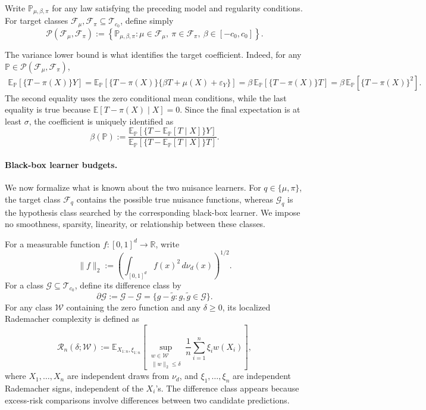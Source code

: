 \documentclass[11pt]{article}
\begin{document}
Write \(\mathbb P_{\mu,\beta,\pi}\) for any law satisfying the preceding
model and regularity conditions.  For target classes
\(\mathcal F_\mu,\mathcal F_\pi\subseteq\mathcal T_{c_0}\), define simply
\begin{equation}
\mathcal P(\mathcal F_\mu,\mathcal F_\pi)
:=
\left\{\mathbb P_{\mu,\beta,\pi}:
\mu\in\mathcal F_\mu,\ 
\pi\in\mathcal F_\pi,\ 
\beta\in[-c_0,c_0]\right\}.
\label{eq:distribution-family}
\end{equation}

The variance lower bound is what identifies the target coefficient.  Indeed,
for any \(\mathbb P\in\mathcal P(\mathcal F_\mu,\mathcal F_\pi)\),
\begin{align*}
\mathbb E_{\mathbb P}\!\left[
\{T-\pi(X)\}Y
\right]
=
\mathbb E_{\mathbb P}\!\left[
\{T-\pi(X)\}
\{\beta T+\mu(X)+\varepsilon_Y\}
\right]
=
\beta\,
\mathbb E_{\mathbb P}\!\left[
\{T-\pi(X)\}T
\right]
=
\beta\,
\mathbb E_{\mathbb P}\![
\{T-\pi(X)\}^2].
\end{align*}
The second equality uses the zero conditional mean conditions, while the last equality is true because \(\mathbb E[T-\pi(X)\mid X]=0\).  Since the final expectation is at
least \(\sigma\), the coefficient is uniquely identified as
\begin{equation}
\beta(\mathbb P)
:=
\frac{
\mathbb E_{\mathbb P}[\{T-\mathbb E_{\mathbb P}[T\mid X]\}Y]
}{
\mathbb E_{\mathbb P}[\{T-\mathbb E_{\mathbb P}[T\mid X]\}T]
}.
\label{eq:beta-functional}
\end{equation}

\paragraph{Black-box learner budgets.}
We now formalize what is known about the two nuisance learners.  For
\(q\in\{\mu,\pi\}\), the target class \(\mathcal F_q\) contains the
possible true nuisance functions, whereas \(\mathcal G_q\) is the hypothesis
class searched by the corresponding black-box learner.  We impose no
smoothness, sparsity, linearity, or relationship between these classes.

For a measurable function \(f:[0,1]^d\to\mathbb R\), write
\[
\|f\|_2
:=
\left(
\int_{[0,1]^d}f(x)^2\,d\nu_d(x)
\right)^{1/2}.
\]
For a class \(\mathcal G\subseteq\mathcal T_{c_0}\), define its
difference class by
\[
\partial\mathcal G
:=
\mathcal G-\mathcal G
=
\{g-\widetilde g:g,\widetilde g\in\mathcal G\}.
\]
For any class \(\mathcal W\) containing the zero function and any
\(\delta\geq0\), its localized Rademacher complexity is defined as
\begin{equation}
\mathcal R_n(\delta;\mathcal W)
:=
\mathbb E_{X_{1:n},\xi_{1:n}}
\left[
\sup_{\substack{w\in\mathcal W\\ \|w\|_2\leq\delta}}
\frac1n\sum_{i=1}^n\xi_iw(X_i)
\right],
\label{eq:localized-rademacher}
\end{equation}
where \(X_1,\ldots,X_n\) are independent draws from \(\nu_d\), and
\(\xi_1,\ldots,\xi_n\) are independent Rademacher signs, independent of the
\(X_i\)'s.  The difference class appears because excess-risk comparisons
involve differences between two candidate predictions.
\end{document}
